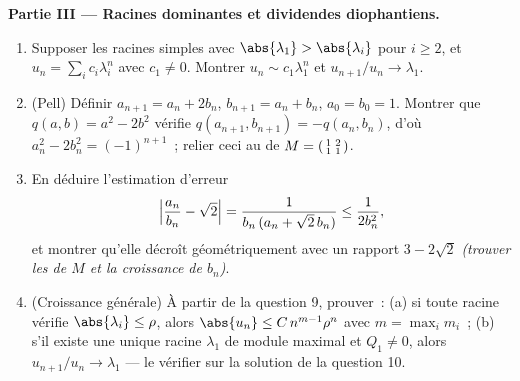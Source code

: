 \begin{problem}
\medskip
\noindent\textbf{Partie III --- Racines dominantes et dividendes
diophantiens.}
\begin{enumerate}[resume]
  \item Supposer les racines simples avec $\abs{\lambda_1} >
        \abs{\lambda_i}$ pour $i \geq 2$, et $u_n = \sum_i c_i
        \lambda_i^n$ avec $c_1 \neq 0$. Montrer $u_n \sim
        c_1\lambda_1^n$ et $u_{n+1}/u_n \to \lambda_1$.
  \item (Pell) Définir $a_{n+1} = a_n + 2b_n$, $b_{n+1} = a_n +
        b_n$, $a_0 = b_0 = 1$. Montrer que $q(a, b) = a^2 - 2b^2$
        vérifie $q(a_{n+1}, b_{n+1}) = -q(a_n, b_n)$, d'où $a_n^2 -
        2b_n^2 = (-1)^{n+1}$~; relier ceci au  de $M =
        \begin{psmallmatrix}1 & 2\\ 1 & 1\end{psmallmatrix}$.
  \item En déduire l'estimation d'erreur
        \[
        \Bigl|\frac{a_n}{b_n} - \sqrt2\Bigr|
        = \frac{1}{b_n\,(a_n + \sqrt2\,b_n)}
        \leq \frac{1}{2b_n^2},
        \]
        et montrer qu'elle décroît géométriquement avec un rapport $3
        - 2\sqrt2$ \emph{(trouver les  de $M$ et la
        croissance de $b_n$)}.
  \item (Croissance générale) À partir de la question 9, prouver~: (a)
        si toute racine vérifie $\abs{\lambda_i} \leq \rho$, alors
        $\abs{u_n} \leq C\,n^{m-1}\rho^n$ avec $m = \max_i m_i$~; (b)
        s'il existe une unique racine $\lambda_1$ de module maximal et
        $Q_1 \neq 0$, alors $u_{n+1}/u_n \to \lambda_1$ --- le
        vérifier sur la solution de la question 10.
\end{enumerate}


\end{problem}
